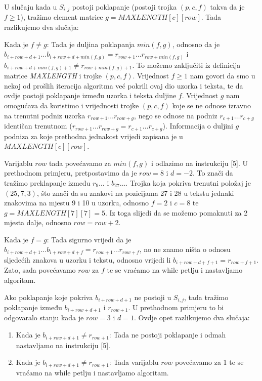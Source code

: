 \documentclass[times, utf8, zavrsni]{fer}
\begin{document}
U slučaju kada u $S_{i,j}$ postoji poklapanje (postoji trojka $(p,c,f)$ takva da je $f\geq 1$), tražimo element matrice $g=MAXLENGTH[c][row]$. Tada razlikujemo dva slučaja:
\begin{enumerate}\begin{sloppypar}
\item Kada je $f\neq g$: Tada je duljina poklapanja $min(f,g)$, odnosno da je $b_{i+row+d+1}\dots b_{i+row+d+min(f,g)} = r_{row+1}\dots r_{row+min(f,g)}$ i $b_{i+row+d+min(f,g)+1} \neq r_{row+min(f,g)+1}$. To možemo zaključiti iz definicija matrice \textit{MAXLENGTH} i trojke $(p,c,f)$. Vrijednost $f\geq 1$ nam govori da smo u nekoj od prošlih iteracija algoritma već pokrili ovaj dio uzorka i teksta, te da ovdje postoji poklapanje između uzorka i teksta duljine $f$. Vrijednost $g$ nam omogućava da koristimo i vrijednosti trojke $(p,c,f)$ koje se ne odnose izravno na trenutni podniz uzorka $r_{row+1}\dots r_{row+g} $, nego se odnose na podniz $ r_{c+1}\dots r_{c+g} $ identičan trenutnom ($r_{row+1}\dots r_{row+g}=r_{c+1}\dots r_{c+g}$). Informacija o duljini $g$ podniza za koje prethodna jednakost vrijedi zapisana je u $MAXLENGTH[c][row]$.

Varijablu $row$ tada povećavamo za $min(f,g)$ i odlazimo na instrukciju [5]. U prethodnom primjeru, pretpostavimo da je $row=8$ i $d=-2$. To znači da tražimo preklapanje između $r_{9}\dots$ i $b_{27}\dots$. Trojka koja pokriva trenutni položaj je $(25,7,3)$, što znači da su znakovi na pozicijama 27 i 28 u tekstu jednaki znakovima na mjestu 9 i 10 u uzorku, odnosno $f=2$ i $c=8$ te $g=MAXLENGTH[7][7]=5$. Iz toga slijedi da se možemo pomaknuti za 2 mjesta dalje, odnosno $row = row + 2$.
\item Kada je $f = g$: Tada sigurno vrijedi da je $b_{i+row+d+1}\dots b_{i+row+d+f} = r_{row+1}\dots r_{row+f}$, no ne znamo ništa o odnosu sljedećih znakova u uzorku i tekstu, odnosno vrijedi li $b_{i+row+d+f+1} = r_{row+f+1}$. Zato, sada povećavamo $row$ za $f$ te se vraćamo na while petlju i nastavljamo algoritam.
\end{sloppypar}\end{enumerate}
Ako poklapanje koje pokriva $b_{i+row+d+1}$ ne postoji u $S_{i,j}$, tada tražimo poklapanje između $b_{i+row+d+1}$ i $r_{row+1}$. U prethodnom primjeru to bi odgovaralo stanju kada je $row=3$ i $d=1$. Ovdje opet razlikujemo dva slučaja:
\begin{enumerate}
\item Kada je $b_{i+row+d+1}\neq r_{row+1}$: Tada ne postoji poklapanje i odmah nastavljamo na instrukciju [5].
\item Kada je $b_{i+row+d+1}\neq r_{row+1}$: Tada varijablu $row$ povećavamo za 1 te se vraćamo na while petlju i nastavljamo algoritam.
\end{enumerate}
\end{document}
